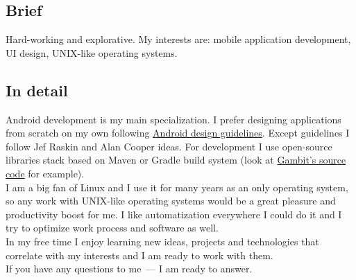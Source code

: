     \subsection*{Brief}

      Hard-working and explorative. My interests are:
      mobile application development, UI design, UNIX-like
      operating systems.

    \subsection*{In detail}

      Android development is my main specialization. I prefer designing
      applications from scratch on my own following
      \href{https://developer.android.com/design/}{Android design guidelines}.
      Except guidelines I follow Jef Raskin
      and Alan Cooper ideas. For development I use open-source libraries
      stack based on Maven or Gradle build system (look at
      \href{https://github.com/ming13/gambit}{Gambit’s source code} for example). \\

      I am a big fan of Linux and I use it for many years as
      an only operating system, so any work with UNIX-like operating systems
      would be a great pleasure and productivity boost for me.
      I like automatization everywhere I could do it and I try to optimize
      work process and software as well. \\

      In my free time I enjoy learning new ideas, projects and technologies
      that correlate with my interests and I am ready to work with them. \\

      If you have any questions to me~--- I am ready to answer.

  \vfill


